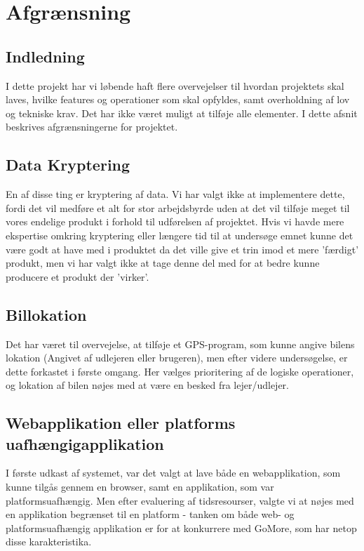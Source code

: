 \documentclass[a4paper,12pt,fleqn,oneside]{article}
\begin{document}
\section{Afgrænsning}
\subsection*{Indledning}
I dette projekt har vi løbende haft flere overvejelser til hvordan projektets skal laves, hvilke features og operationer som skal opfyldes, samt overholdning af lov og tekniske krav. Det har ikke været muligt at tilføje alle elementer. I dette afsnit beskrives afgrænsningerne for projektet.

\subsection{Data Kryptering}
En af disse ting er kryptering af data. Vi har valgt ikke at implementere dette, fordi det vil medføre et alt for stor arbejdsbyrde uden at det vil tilføje meget til vores endelige produkt i forhold til udførelsen af projektet. Hvis vi havde mere ekspertise omkring kryptering eller længere tid til at undersøge emnet kunne det være godt at have med i produktet da det ville give et trin imod et mere 'færdigt' produkt, men vi har valgt ikke at tage denne del med for at bedre kunne producere et produkt der 'virker'. 

\subsection{Billokation}
Det har været til overvejelse, at tilføje et GPS-program, som kunne angive bilens lokation (Angivet af udlejeren eller brugeren), men efter videre undersøgelse, er dette forkastet i første omgang. Her vælges prioritering af de logiske operationer, og lokation af bilen nøjes med at være en besked fra lejer/udlejer. 

\subsection{Webapplikation eller platforms uafhængigapplikation}
I første udkast af systemet, var det valgt at lave både en webapplikation, som kunne tilgås gennem en browser, samt en applikation, som var platformsuafhængig. Men efter evaluering af tidsresourser, valgte vi at nøjes med en applikation begrænset til en platform - tanken om både web- og platformsuafhængig applikation er for at konkurrere med GoMore, som har netop disse karakteristika.
\end{document}
